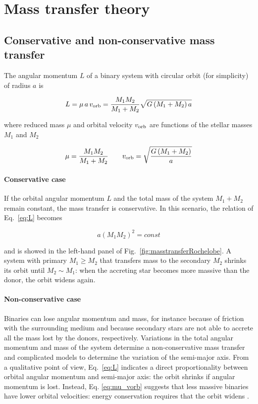 \documentclass[a4paper,titlepage]{book}     	%
\begin{document}
\section{Mass transfer theory}\label{subsec:masstransfer}
\subsection{Conservative and non-conservative mass transfer}\label{subsec:conservativeMT}
The angular momentum $L$ of a binary system with circular orbit (for simplicity) of radius $a$ is

\begin{equation}\label{eq:L}
L = \mu\,a\,v_\textup{orb} = \frac{M_1 M_2}{M_1 + M_2} \sqrt{G \left(M_1 + M_2\right) a}
\end{equation}

where reduced mass $\mu$ and orbital velocity $v_{\rm orb}$ are functions of the stellar masses $M_1$ and $M_2$

\begin{equation}\label{eq:mu_vorb}
\mu = \frac{M_1 M_2}{M_1 + M_2} \quad \quad  v_\textup{orb}=\sqrt{\frac{G \left(M_1+M_2\right)}{a}} 
\end{equation}

\paragraph{Conservative case} If the orbital angular momentum $L$ and the total mass of the system $M_1 + M_2$ remain constant, the mass transfer is conservative. In this scenario, the relation of Eq.\ \ref{eq:L} becomes

\begin{equation}\label{eq:a_const}
a \left(M_1M_2\right)^2 = const
\end{equation}

and is showed in the left-hand panel of Fig.\ \ref{fig:masstransferRochelobe}. A system with primary $M_1 \geq M_2$ that transfers mass to the secondary $M_2$ shrinks its orbit until $M_2 \sim M_1$: when the accreting star becomes more massive than the donor, the orbit widens again.

\paragraph{Non-conservative case} Binaries can lose angular momentum and mass, for instance because of friction with the surrounding medium and because secondary stars are not able to accrete all the mass lost by the donors, respectively. Variations in the total angular momentum and mass of the system determine a non-conservative mass transfer and complicated models to determine the variation of the semi-major axis. From a qualitative point of view, Eq.\ \ref{eq:L} indicates a direct proportionality between orbital angular momentum and semi-major axis: the orbit shrinks if angular momentum is lost. Instead, Eq. \ref{eq:mu_vorb} suggests that less massive binaries have lower orbital velocities: energy conservation requires that the orbit widens \cite{Hurley2002}. 
\end{document}
